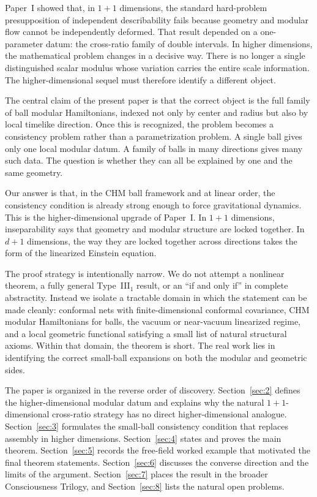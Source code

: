 \documentclass[12pt]{article}
\theoremstyle{definition}
\theoremstyle{remark}
\begin{document}
Paper~I\cite{PaperI} showed that, in \(1+1\) dimensions, the standard hard-problem presupposition of independent describability fails because geometry and modular flow cannot be independently deformed. That result depended on a one-parameter datum: the cross-ratio family of double intervals. In higher dimensions, the mathematical problem changes in a decisive way. There is no longer a single distinguished scalar modulus whose variation carries the entire scale information. The higher-dimensional sequel must therefore identify a different object.

The central claim of the present paper is that the correct object is the full family of ball modular Hamiltonians, indexed not only by center and radius but also by local timelike direction. Once this is recognized, the problem becomes a consistency problem rather than a parametrization problem. A single ball gives only one local modular datum. A family of balls in many directions gives many such data. The question is whether they can all be explained by one and the same geometry.

Our answer is that, in the CHM ball framework and at linear order, the consistency condition is already strong enough to force gravitational dynamics. This is the higher-dimensional upgrade of Paper~I\cite{PaperI}. In \(1+1\) dimensions, inseparability says that geometry and modular structure are locked together. In \(d+1\) dimensions, the way they are locked together across directions takes the form of the linearized Einstein equation.

The proof strategy is intentionally narrow. We do not attempt a nonlinear theorem, a fully general Type~III$_1$ result, or an ``if and only if'' in complete abstractity. Instead we isolate a tractable domain in which the statement can be made cleanly: conformal nets with finite-dimensional conformal covariance, CHM modular Hamiltonians for balls, the vacuum or near-vacuum linearized regime, and a local geometric functional satisfying a small list of natural structural axioms. Within that domain, the theorem is short. The real work lies in identifying the correct small-ball expansions on both the modular and geometric sides.

The paper is organized in the reverse order of discovery. Section~\ref{sec:2} defines the higher-dimensional modular datum and explains why the natural \(1+1\)-dimensional cross-ratio strategy has no direct higher-dimensional analogue. Section~\ref{sec:3} formulates the small-ball consistency condition that replaces assembly in higher dimensions. Section~\ref{sec:4} states and proves the main theorem. Section~\ref{sec:5} records the free-field worked example that motivated the final theorem statements. Section~\ref{sec:6} discusses the converse direction and the limits of the argument. Section~\ref{sec:7} places the result in the broader Consciousness Trilogy, and Section~\ref{sec:8} lists the natural open problems.
\end{document}
